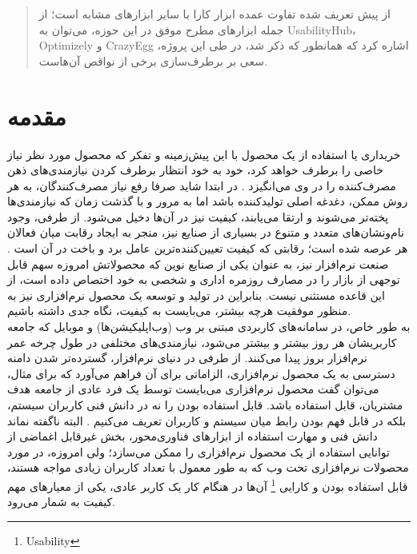 \documentclass{article}
\theoremstyle{definition}
\begin{document}
\begin{abstract}
از پیش تعریف شده تفاوت عمده ابزار کارا با سایر ابزارهای مشابه است؛ از جمله ابزارهای مطرح موفق در این حوزه، می‌توان به UsabilityHub، Optimizely و CrazyEgg اشاره کرد که همانطور که ذکر شد، در طی این پروژه، سعی بر برطرف‌سازی برخی از نواقص آن‌هاست.
	\end{abstract}
	\newpage
	\tableofcontents
	\newpage
	
	\section{مقدمه}
خریداری یا استفاده از یک محصول با این پیش‌زمینه و تفکر که محصول مورد نظر نیاز خاصی را برطرف خواهد کرد، خود به خود انتظار برطرف کردن نیازمندی‌های ذهن مصرف‌کننده را در وی می‌انگیزد
\cite{abdollahzade}.
در ابتدا شاید صرفا رفع نیاز مصرف‌کنندگان، به هر روش ممکن، دغدغه اصلی تولیدکننده باشد اما به مرور و با گذشت زمان که نیازمندی‌ها پخته‌تر می‌شوند و ارتقا می‌یابند، کیفیت نیز در آن‌ها دخیل می‌شود. از طرفی، وجود نام‌ونشان‌های متعدد و متنوع در بسیاری از صنایع نیز، منجر به ایجاد رقابت میان فعالان هر عرصه شده است؛ رقابتی که کیفیت تعیین‌کننده‌ترین عامل برد و باخت در آن است
\cite{pressman}.
صنعت نرم‌افزار نیز، به عنوان یکی از صنایع نوین که محصولاتش امروزه سهم قابل توجهی از بازار را در مصارف روزمره اداری و شخصی به خود اختصاص داده است، از این قاعده مستثنی نیست. بنابراین در تولید و توسعه یک محصول نرم‌افزاری نیز به منظور موفقیت هرچه بیشتر، می‌بایست به کیفیت، نگاه جدی داشته باشیم.\\
به طور خاص، در سامانه‌های کاربردی مبتنی بر وب (وب‌اپلیکیشن‌ها) و موبایل که جامعه کاربریشان هر روز بیشتر و بیشتر می‌شود، نیازمندی‌های مختلفی در طول چرخه عمر نرم‌افزار بروز پیدا می‌کنند. از طرفی در دنیای نرم‌افزار،  گسترده‌تر شدن دامنه دسترسی به یک محصول نرم‌افزاری، الزاماتی برای آن فراهم می‌آورد که برای مثال، می‌توان گفت محصول نرم‌افزاری می‌بایست توسط یک فرد عادی از جامعه هدف مشتریان، قابل استفاده باشد. قابل استفاده بودن را نه در دانش فنی کاربران سیستم، بلکه در قابل فهم بودن رابط میان سیستم و کاربران تعریف می‌کنیم
\cite{measuring}.
البته ناگفته نماند دانش فنی و مهارت استفاده از ابزارهای فناوری‌محور، بخش غیرقابل اغماضی از توانایی استفاده از یک محصول نرم‌افزاری را ممکن می‌سازد؛ ولی امروزه، در مورد محصولات نرم‌افزاری تحت وب که به طور معمول با تعداد کاربران زیادی مواجه هستند، قابل استفاده بودن و کارایی 
\footnote{Usability}
آن‌ها در هنگام کار یک کاربر عادی، یکی از معیارهای مهم کیفیت به شمار می‌رود.
\end{document}
